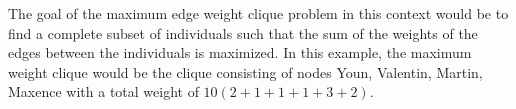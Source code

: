     The goal of the maximum edge weight clique problem in this context would be to find a complete subset of individuals such that the sum of the weights of the edges between the individuals is maximized. In this example, the maximum weight clique would be the clique consisting of nodes Youn, Valentin, Martin, Maxence with a total weight of $10(2+1+1+1+3+2)$.





\newpage